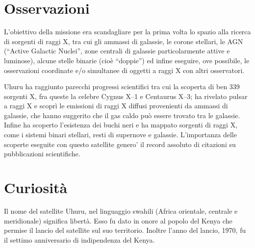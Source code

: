 \documentclass[12pt,a4paper]{article}
\begin{document}
\section*{Osservazioni}
\label{osservazioni}

L'obiettivo della missione era scandagliare per la prima volta lo spazio alla ricerca di sorgenti di raggi X, tra cui gli ammassi di galassie, le corone stellari, le AGN (``Active Galactic Nuclei'', zone centrali di galassie particolarmente attive e luminose), alcune stelle binarie (cioè ``doppie'') ed infine eseguire, ove possibile, le osservazioni coordinate e\slash o simultanee di oggetti a raggi X con altri osservatori.

Uhuru ha raggiunto parecchi progressi scientifici tra cui la scoperta di ben 339 sorgenti X, fra queste la celebre Cygnus X--1 e Centaurus X--3; ha rivelato pulsar a raggi X e scoprì le emissioni di raggi X diffusi provenienti da ammassi di galassie, che hanno suggerito che il gas caldo può essere trovato tra le galassie. Infine ha scoperto l'esistenza dei buchi neri e ha mappato sorgenti di raggi X, come i sistemi binari stellari, resti di supernove e galassie.
L'importanza delle scoperte eseguite con questo satellite genero' il record assoluto di citazioni su pubblicazioni scientifiche.

\section*{Curiosità}
\label{curiosit}

Il nome del satellite Uhuru, nel linguaggio swahili (Africa orientale, centrale e meridionale) significa libertà. Esso fu dato in onore al popolo del Kenya che permise il lancio del satellite sul suo territorio. Inoltre l'anno del lancio, 1970, fu il settimo anniversario di indipendenza del Kenya. 
\end{document}
